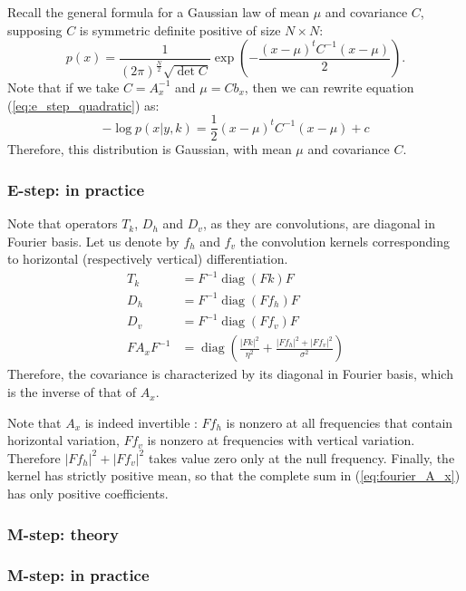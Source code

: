 \documentclass[english,a4paper]{article}
\theoremstyle{plain}
\theoremstyle{definition}
\theoremstyle{remark}
\DeclareMathOperator{\diag}{diag}
\begin{document}
Recall the general formula for a Gaussian law of mean $\mu$ and covariance $C$, supposing $C$ is symmetric definite positive of size $N\times N$:
\begin{equation}\label{eq:general_gaussian}
p(x) = \frac{1}{(2\pi)^{\frac{N}{2}} \sqrt{\det C}} \exp \left( -\frac{(x-\mu)^t C^{-1} (x-\mu)}{2} \right) .
\end{equation}
Note that if we take $C = A_x^{-1}$ and $\mu = C b_x$, then we can rewrite equation (\ref{eq:e_step_quadratic}) as:
\begin{equation}\label{eq:e_step_gaussian}
-\log p(x | y,k) = \frac{1}{2} (x-\mu)^t C^{-1} (x-\mu) + c
\end{equation}
Therefore, this distribution is Gaussian, with mean $\mu$ and covariance $C$.


\subsubsection{E-step: in practice}
Note that operators $T_k$, $D_h$ and $D_v$, as they are convolutions, are diagonal in Fourier basis. Let us denote by $f_h$ and $f_v$ the convolution kernels corresponding to horizontal (respectively vertical) differentiation.
\begin{align}
T_k &= F^{-1} \diag(Fk) F\\
D_h &= F^{-1} \diag(Ff_h) F \nonumber \\
D_v &= F^{-1} \diag(Ff_v) F \nonumber \\
\label{eq:fourier_A_x}
F A_x F^{-1} &= \diag \left( \frac{|Fk|^2}{\eta^2} + \frac{|Ff_h|^2 + |Ff_v|^2}{\sigma^2} \right)
\end{align}
Therefore, the covariance is characterized by its diagonal in Fourier basis, which is the inverse of that of $A_x$. 

Note that $A_x$ is indeed invertible : $Ff_h$ is nonzero at all frequencies that contain horizontal variation, $Ff_v$ is nonzero at frequencies with vertical variation. Therefore $|Ff_h|^2 + |Ff_v|^2$ takes value zero only at the null frequency. Finally, the kernel has strictly positive mean, so that the complete sum in (\ref{eq:fourier_A_x}) has only positive coefficients.

\subsubsection{M-step: theory}

\subsubsection{M-step: in practice}
\end{document}
